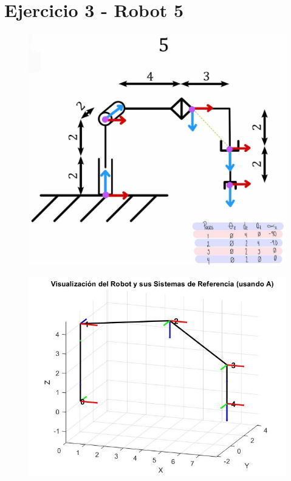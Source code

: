 \newpage
\section{Ejercicio 3 - Robot 5}
\begin{figure}[h]
	\centering
	\includegraphics[width=0.6\linewidth]{../img/ejercicio_5-dibujo}
	\caption[Diagráma]{}
	\label{fig:ejercicio5-dibujo}
\end{figure}
\begin{figure}[h]
	\centering
	\includegraphics[width=0.6\linewidth]{../img/ejercicio_5-matlab}
	\caption[MATLAB]{}
	\label{fig:ejercicio5-matlab}
\end{figure}
